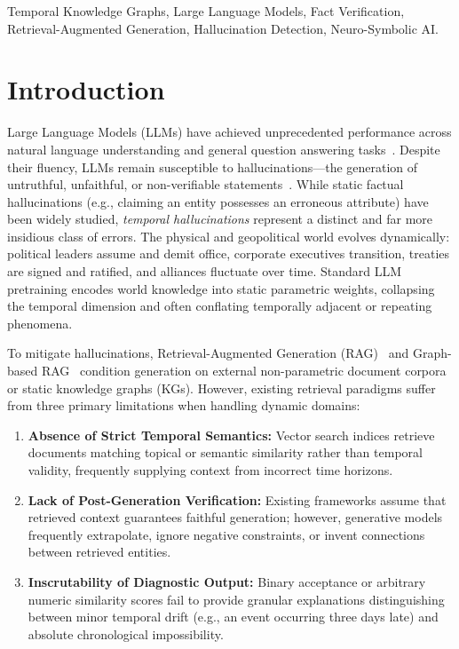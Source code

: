 \documentclass[conference]{IEEEtran}
\begin{document}
\begin{IEEEkeywords}
Temporal Knowledge Graphs, Large Language Models, Fact Verification, Retrieval-Augmented Generation, Hallucination Detection, Neuro-Symbolic AI.
\end{IEEEkeywords}

\section{Introduction}
Large Language Models (LLMs) have achieved unprecedented performance across natural language understanding and general question answering tasks~\cite{yang2024qwen2}. Despite their fluency, LLMs remain susceptible to hallucinations—the generation of untruthful, unfaithful, or non-verifiable statements~\cite{ji2023survey, huang2023survey}. While static factual hallucinations (e.g., claiming an entity possesses an erroneous attribute) have been widely studied, \textit{temporal hallucinations} represent a distinct and far more insidious class of errors. The physical and geopolitical world evolves dynamically: political leaders assume and demit office, corporate executives transition, treaties are signed and ratified, and alliances fluctuate over time. Standard LLM pretraining encodes world knowledge into static parametric weights, collapsing the temporal dimension and often conflating temporally adjacent or repeating phenomena.

To mitigate hallucinations, Retrieval-Augmented Generation (RAG)~\cite{lewis2020retrieval} and Graph-based RAG~\cite{edge2024graphrag, sun2024think} condition generation on external non-parametric document corpora or static knowledge graphs (KGs). However, existing retrieval paradigms suffer from three primary limitations when handling dynamic domains:
\begin{enumerate}
    \item \textbf{Absence of Strict Temporal Semantics:} Vector search indices retrieve documents matching topical or semantic similarity rather than temporal validity, frequently supplying context from incorrect time horizons.
    \item \textbf{Lack of Post-Generation Verification:} Existing frameworks assume that retrieved context guarantees faithful generation; however, generative models frequently extrapolate, ignore negative constraints, or invent connections between retrieved entities.
    \item \textbf{Inscrutability of Diagnostic Output:} Binary acceptance or arbitrary numeric similarity scores fail to provide granular explanations distinguishing between minor temporal drift (e.g., an event occurring three days late) and absolute chronological impossibility.
\end{enumerate}
\end{document}
